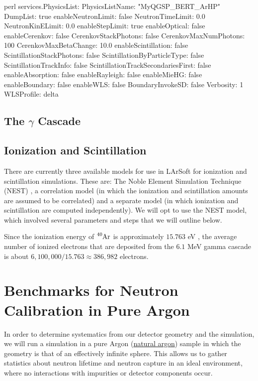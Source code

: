 \documentclass[8pt]{refart}
\begin{document}
\begin{code}{perl}
services.PhysicsList:{
    PhysicsListName: "MyQGSP_BERT_ArHP"
    DumpList: true
    enableNeutronLimit: false
    NeutronTimeLimit: 0.0
    NeutronKinELimit: 0.0
    enableStepLimit: true
    enableOptical: false
    enableCerenkov: false
    CerenkovStackPhotons: false
    CerenkovMaxNumPhotons: 100
    CerenkovMaxBetaChange: 10.0
    enableScintillation: false
    ScintillationStackPhotons: false
    ScintillationByParticleType: false
    ScintillationTrackInfo: false
    ScintillationTrackSecondariesFirst: false
    enableAbsorption: false
    enableRayleigh: false
    enableMieHG: false
    enableBoundary: false
    enableWLS: false
    BoundaryInvokeSD: false
    Verbosity: 1
    WLSProfile: delta
}
\end{code}

\subsection{The $\gamma$ Cascade}




\subsection{Ionization and Scintillation}
There are currently three available models for use in LArSoft for ionization and scintillation simulations.  These are: The Noble Element Simulation Technique (NEST) \cite{NEST1}, a correlation model (in which the ionization and scintillation amounts are assumed to be correlated) and a separate model (in which ionization and scintillation are computed independently).  We will opt to use the NEST model, which involved several parameters and steps that we will outline below.

Since the ionization energy of $\ce{^{40}Ar}$ is approximately $15.763$ eV \cite{Weitzel}, the average number of ionized electrons that are deposited from the $6.1$ MeV gamma cascade is about $6,100,000/15.763 \approx 386,982$ electrons.




\section{Benchmarks for Neutron Calibration in Pure Argon}
In order to determine systematics from our detector geometry and the simulation, we will run a simulation in a pure Argon (\hyperref[naturalargon]{natural argon}) sample in which the geometry is that of an effectively infinite sphere.  This allows us to gather statistics about neutron lifetime and neutron capture in an ideal environment, where no interactions with impurities or detector components occur.  
\end{document}
